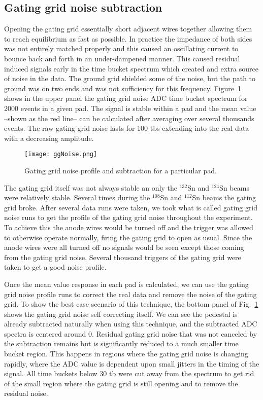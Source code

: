 \subsection{Gating grid noise subtraction}
\label{sec:ggnoisesub}
Opening the gating grid essentially short adjacent wires together allowing them to reach equilibrium as fast as possible. In practice the impedance of both sides was not entirely matched properly and this caused an oscillating current to bounce back and forth in an under-dampened manner. This caused residual induced signals early in the time bucket spectrum which created and extra source of noise in the data. The ground grid shielded some of the noise, but the path to ground was on two ends and was not sufficiency for this frequency. Figure~\ref{fig:ggNoiseSub} shows in the upper panel the gating grid noise ADC time bucket spectrum for 2000 events in a given pad. The signal is stable within a pad and the mean value --shown as the red line-- can be calculated after averaging over several thousands events. The raw gating grid noise lasts for 100 tbs extending into the real data with a decreasing amplitude. 

\begin{figure}[!htb]
\centering
\texttt{[image: ggNoise.png]}
\caption{Gating grid noise profile and subtraction for a particular pad.}
\label{fig:ggNoiseSub}
\end{figure}


The gating grid itself was not always stable an only the ${}^{132}$Sn and ${}^{124}$Sn beams were relatively stable. Several times during the ${}^{108}$Sn and ${}^{112}$Sn beams the gating grid broke. After several data runs were taken, we took what is called gating grid noise runs to get the profile of the gating grid noise throughout the experiment. To achieve this the anode wires would be turned off and the trigger was allowed to otherwise operate normally, firing the gating grid to open as usual. Since the anode wires were all turned off no signals would be seen except those coming from the gating grid noise. Several thousand triggers of the gating grid were taken to get a good noise profile. 

Once the mean value response in each pad is calculated, we can use the gating grid noise profile runs to correct the real data and remove the noise of the gating grid. To show the best case scenario of this technique, the bottom panel of Fig.~\ref{fig:ggNoiseSub} shows the gating grid noise self correcting itself. We can see the pedestal is already subtracted naturally when using this technique, and the subtracted ADC spectra is centered around 0. Residual gating grid noise that was not canceled by the subtraction remains but is significantly reduced to a much smaller time bucket region. This happens in regions where the gating grid noise is changing rapidly, where the ADC value is dependent upon small jitters in the timing of the signal. All time buckets below 30 tb were cut away from the spectrum to get rid of the small region where the gating grid is still opening and to remove the residual noise. 


